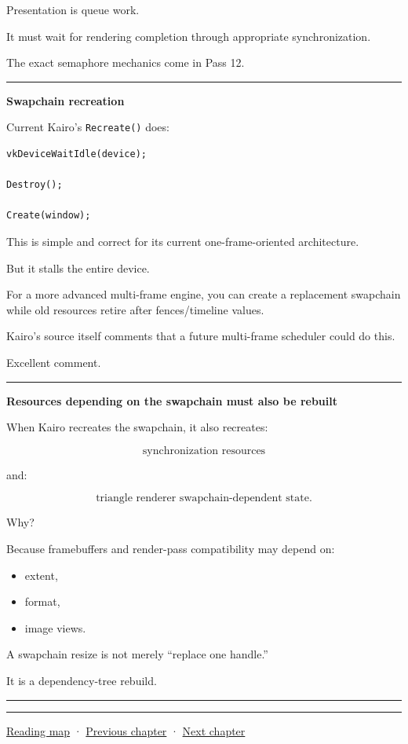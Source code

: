 Presentation is queue work.

It must wait for rendering completion through appropriate synchronization.

The exact semaphore mechanics come in Pass 12.

\begin{center}\rule{0.5\linewidth}{0.5pt}\end{center}

\textbf{Swapchain recreation}

Current Kairo's \texttt{Recreate()} does:

\begin{verbatim}
vkDeviceWaitIdle(device);

Destroy();

Create(window);
\end{verbatim}

This is simple and correct for its current one-frame-oriented architecture.

But it stalls the entire device.

For a more advanced multi-frame engine, you can create a replacement swapchain while old resources retire after fences/timeline values.

Kairo's source itself comments that a future multi-frame scheduler could do this.

Excellent comment.

\begin{center}\rule{0.5\linewidth}{0.5pt}\end{center}

\textbf{Resources depending on the swapchain must also be rebuilt}

When Kairo recreates the swapchain, it also recreates:

\[
\text{synchronization resources}
\]

and:

\[
\text{triangle renderer swapchain-dependent state}.
\]

Why?

Because framebuffers and render-pass compatibility may depend on:

\begin{itemize}
\tightlist
\item
  extent,
\item
  format,
\item
  image views.
\end{itemize}

A swapchain resize is not merely ``replace one handle.''

It is a dependency-tree rebuild.

\begin{center}\rule{0.5\linewidth}{0.5pt}\end{center}

\begin{center}\rule{0.5\linewidth}{0.5pt}\end{center}

\hyperref[volume-reading-map]{Reading map} · \hyperref[05-engine-i-ch019]{Previous chapter} · \hyperref[05-engine-i-ch021]{Next chapter}
